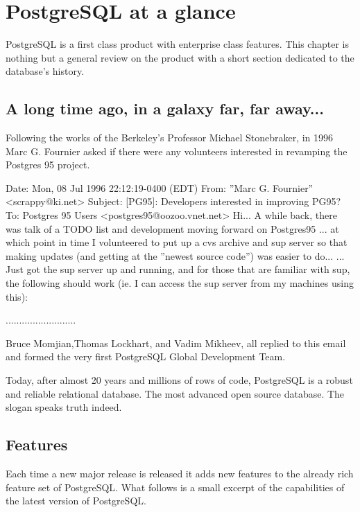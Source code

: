 \chapter{PostgreSQL at a glance}
PostgreSQL is a first class product with enterprise class features.
This chapter is nothing but a general review on the product with a short section dedicated to the 
database's history.

\section{A long time ago, in a galaxy far, far away...}

Following the works of the Berkeley's Professor  Michael Stonebraker, in 1996
Marc G. Fournier asked if there were any volunteers interested
in revamping the Postgres 95 project.\newline
\begin{smallverbatim}

Date: Mon, 08 Jul 1996 22:12:19-0400 (EDT) 
From: ”Marc G. Fournier” <scrappy@ki.net>
Subject: [PG95]: Developers interested in improving PG95?
To: Postgres 95 Users <postgres95@oozoo.vnet.net>
Hi... A while back, there was talk of a TODO list and development moving forward on Postgres95 ...
at which point in time I volunteered to put up a cvs archive and sup server so that making updates 
(and getting at the ”newest source code”) was easier to do...
... Just got the sup server up and running, and for those that are familiar with sup, the following 
should work (ie. I can access the sup server from my machines using this): 

..........................
\end{smallverbatim}


Bruce Momjian,Thomas Lockhart, 
and Vadim Mikheev, all replied to this email and formed the very first PostgreSQL Global Development Team.\newline 

Today, after almost 20 years and millions of rows of code, PostgreSQL is a robust and reliable 
relational database. The most advanced open source database. The slogan speaks truth indeed.

\section{Features}
Each time a new major release is released it adds new features to the already 
rich feature set of PostgreSQL. What follows is a small excerpt of the capabilities of the latest version of PostgreSQL.

